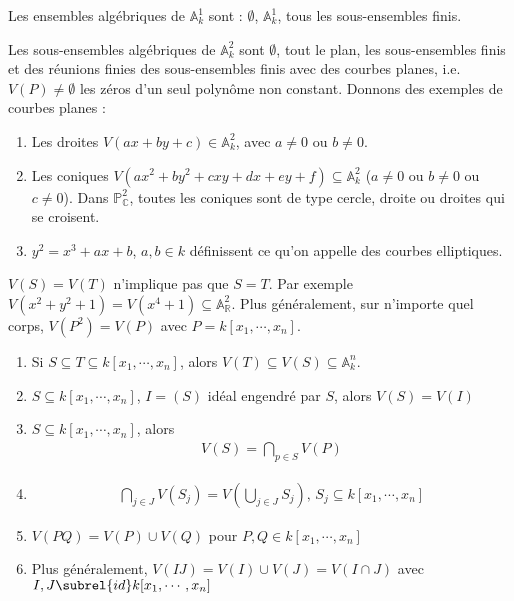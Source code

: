         \begin{exo}
            Les ensembles algébriques de $\mathbb{A}^1_k$ sont : $\emptyset$, $\mathbb{A}_k^1$, tous les sous-ensembles finis.
        \end{exo}
        \begin{expl}
            Les sous-ensembles algébriques de $\mathbb{A}^2_k$ sont $\emptyset$, tout le plan, les sous-ensembles finis et des réunions finies des sous-ensembles finis avec des courbes planes, i.e. $V(P) \neq \emptyset$ les zéros d'un seul polynôme non constant. Donnons des exemples de courbes planes :
            \begin{enumerate}
                \item Les droites $V(ax + by + c) \in \mathbb{A}_k^2$, avec $a \neq 0$ ou $b \neq 0$.
                \item Les coniques $V(ax^2 + by^2 + cxy + dx + ey + f) \subseteq \mathbb{A}_k^2$ ($a \neq 0$ ou $b \neq 0$ ou $c \neq 0$). Dans $\mathbb{P}_\mathbb{C}^2$, toutes les coniques sont de type cercle, droite ou droites qui se croisent.
                \item $y^2 = x^3 + ax + b$, $a,b \in k$ définissent ce qu'on appelle des courbes elliptiques.
            \end{enumerate}
        \end{expl}
        \begin{remq}
            $V(S) = V(T)$ n'implique pas que $S = T$. Par exemple $V(x^2 + y^2 + 1) = V(x^4 + 1) \subseteq \mathbb{A}_\mathbb{R}^2$. Plus généralement, sur n'importe quel corps, $V(P^2) = V(P)$ avec $P = k[x_1, \cdots, x_n]$.
        \end{remq}
        \begin{prop}
            \begin{enumerate}
                \item Si $S \subseteq T \subseteq k[x_1, \cdots, x_n]$, alors $V(T) \subseteq V(S) \subseteq \mathbb{A}_k^n$.
                \item $S \subseteq k[x_1, \cdots, x_n]$, $I = (S)$ idéal engendré par $S$, alors $V(S) = V(I)$
                \item $S \subseteq k[x_1, \cdots, x_n]$, alors
                \begin{align*}
                    V(S) = \bigcap_{p \in S} V(P)
                \end{align*}
                \item
                \begin{align*}
                    \bigcap_{j \in J} V(S_j) = V\left(\bigcup_{j \in J} S_j\right),\, S_j \subseteq k[x_1, \cdots, x_n]
                \end{align*}
                \item $V(PQ) = V(P) \cup V(Q)$ pour $P,Q \in k[x_1, \cdots, x_n]$
                \item Plus généralement, $V(IJ) = V(I) \cup V(J) = V(I \cap J)$ avec $I,J \subrel{id} k[x_1, \cdots, x_n]$
            \end{enumerate}
        \end{prop}
